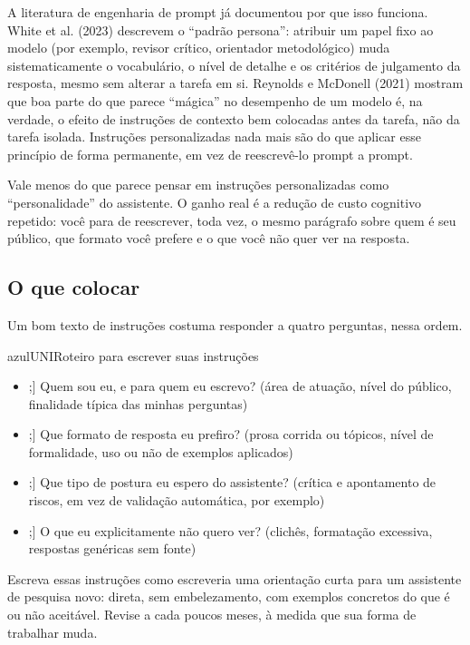 \documentclass[11pt,a4paper]{article}
\newcommand{\checkboxicon}[1]{\tikz[baseline=-0.05cm]{\node[draw=#1,thick,rounded corners=1.2pt,minimum width=0.34cm,minimum height=0.34cm,inner sep=0pt]{};}}
\newcommand{\itemcheck}[2][azulUNI]{\item[\checkboxicon{#1}] #2}
\begin{document}
A literatura de engenharia de prompt já documentou por que isso funciona. White et al. (2023) descrevem o ``padrão persona'': atribuir um papel fixo ao modelo (por exemplo, revisor crítico, orientador metodológico) muda sistematicamente o vocabulário, o nível de detalhe e os critérios de julgamento da resposta, mesmo sem alterar a tarefa em si. Reynolds e McDonell (2021) mostram que boa parte do que parece ``mágica'' no desempenho de um modelo é, na verdade, o efeito de instruções de contexto bem colocadas antes da tarefa, não da tarefa isolada. Instruções personalizadas nada mais são do que aplicar esse princípio de forma permanente, em vez de reescrevê-lo prompt a prompt.

\begin{dica}
Vale menos do que parece pensar em instruções personalizadas como ``personalidade'' do assistente. O ganho real é a redução de custo cognitivo repetido: você para de reescrever, toda vez, o mesmo parágrafo sobre quem é seu público, que formato você prefere e o que você não quer ver na resposta.
\end{dica}

\subsection*{O que colocar}
Um bom texto de instruções costuma responder a quatro perguntas, nessa ordem.

\begin{checklist}{azulUNI}{Roteiro para escrever suas instruções}
\begin{itemize}[leftmargin=1.6em, itemsep=5pt]
  \itemcheck{Quem sou eu, e para quem eu escrevo? (área de atuação, nível do público, finalidade típica das minhas perguntas)}
  \itemcheck{Que formato de resposta eu prefiro? (prosa corrida ou tópicos, nível de formalidade, uso ou não de exemplos aplicados)}
  \itemcheck{Que tipo de postura eu espero do assistente? (crítica e apontamento de riscos, em vez de validação automática, por exemplo)}
  \itemcheck{O que eu explicitamente não quero ver? (clichês, formatação excessiva, respostas genéricas sem fonte)}
\end{itemize}
\end{checklist}
Escreva essas instruções como escreveria uma orientação curta para um assistente de pesquisa novo: direta, sem embelezamento, com exemplos concretos do que é ou não aceitável. Revise a cada poucos meses, à medida que sua forma de trabalhar muda.
\end{document}
